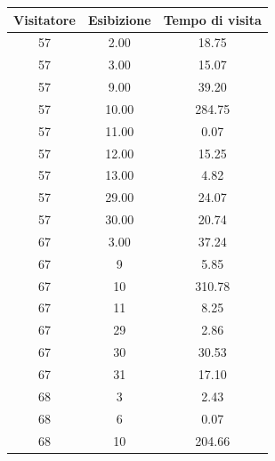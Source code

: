 \documentclass[12pt]{article}
\begin{document}
\begin{table}[!ht]
    \centering
    \begin{tabular}{|c|c|c|}
        \hline
        \textbf{Visitatore} & \textbf{Esibizione} & \textbf{Tempo di visita} \\ \hline
        57                  & 2.00                & 18.75                    \\ \hline
        57                  & 3.00                & 15.07                    \\ \hline
        57                  & 9.00                & 39.20                    \\ \hline
        57                  & 10.00               & 284.75                   \\ \hline
        57                  & 11.00               & 0.07                     \\ \hline
        57                  & 12.00               & 15.25                    \\ \hline
        57                  & 13.00               & 4.82                     \\ \hline
        57                  & 29.00               & 24.07                    \\ \hline
        57                  & 30.00               & 20.74                    \\ \hline
        67                  & 3.00                & 37.24                    \\ \hline
        67                  & 9                   & 5.85                     \\ \hline
        67                  & 10                  & 310.78                   \\ \hline
        67                  & 11                  & 8.25                     \\ \hline
        67                  & 29                  & 2.86                     \\ \hline
        67                  & 30                  & 30.53                    \\ \hline
        67                  & 31                  & 17.10                    \\ \hline
        68                  & 3                   & 2.43                     \\ \hline
        68                  & 6                   & 0.07                     \\ \hline
        68                  & 10                  & 204.66                   \\ \hline

\end{tabular}
\end{table}
\end{document}
